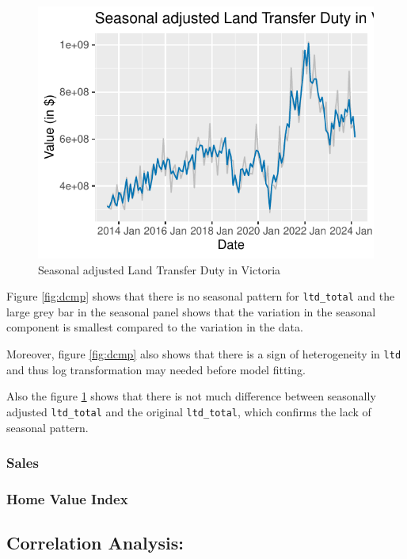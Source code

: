 \documentclass[11pt,a4paper,]{article}
\begin{document}
\begin{figure}[H]

{\centering \includegraphics{Final_Report_files/figure-latex/ssadj-1} 

}

\caption{Seasonal adjusted Land Transfer Duty in Victoria}\label{fig:ssadj}
\end{figure}

Figure \ref{fig:dcmp} shows that there is no seasonal pattern for \texttt{ltd\_total} and the large grey bar in the seasonal panel shows that the variation in the seasonal component is smallest compared to the variation in the data.

Moreover, figure \ref{fig:dcmp} also shows that there is a sign of heterogeneity in \texttt{ltd} and thus log transformation may needed before model fitting.

Also the figure \ref{fig:ssadj} shows that there is not much difference between seasonally adjusted \texttt{ltd\_total} and the original \texttt{ltd\_total}, which confirms the lack of seasonal pattern.

\subsubsection{Sales}\label{sales}

\subsubsection{Home Value Index}\label{home-value-index}

\subsection{Correlation Analysis:}\label{correlation-analysis}
\end{document}
